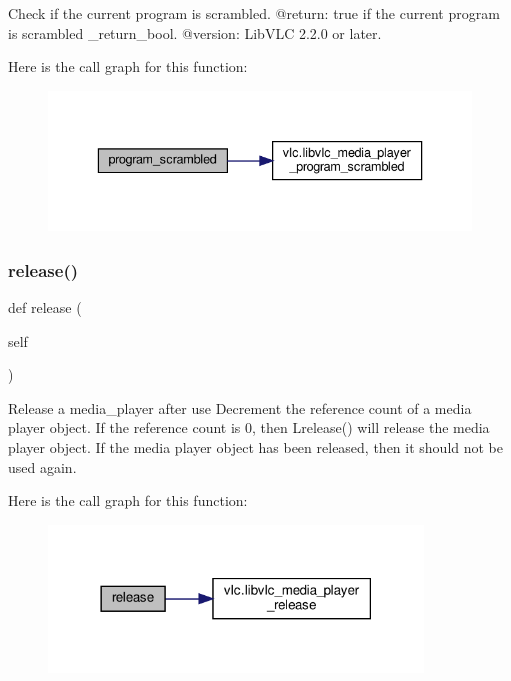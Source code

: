 \begin{DoxyVerb}Check if the current program is scrambled.
@return: true if the current program is scrambled \libvlc_return_bool.
@version: LibVLC 2.2.0 or later.
\end{DoxyVerb}
 Here is the call graph for this function\+:
\nopagebreak
\begin{figure}[H]
\begin{center}
\leavevmode
\includegraphics[width=336pt]{classvlc_1_1_media_player_ab21e3e8564c32ce300d90fac7fb18a99_cgraph}
\end{center}
\end{figure}
\mbox{\label{classvlc_1_1_media_player_a4cd51e19135e5ad4a19eae3ea9c60537}} 
\subsubsection{\texorpdfstring{release()}{release()}}
{\footnotesize\ttfamily def release (\begin{DoxyParamCaption}\item[{}]{self }\end{DoxyParamCaption})}

\begin{DoxyVerb}Release a media_player after use
Decrement the reference count of a media player object. If the
reference count is 0, then L{release}() will
release the media player object. If the media player object
has been released, then it should not be used again.
\end{DoxyVerb}
 Here is the call graph for this function\+:
\nopagebreak
\begin{figure}[H]
\begin{center}
\leavevmode
\includegraphics[width=282pt]{classvlc_1_1_media_player_a4cd51e19135e5ad4a19eae3ea9c60537_cgraph}
\end{center}
\end{figure}
\mbox{\label{classvlc_1_1_media_player_a6394d82a0b79f0f91bb059d20ab43490}} 
